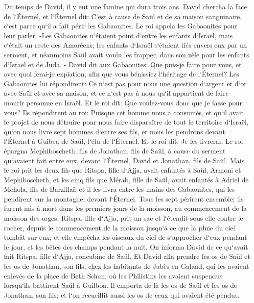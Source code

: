 \verse Du temps de David, il y eut une famine qui dura trois ans. David chercha la face de l`Éternel, et l`Éternel dit: C`est à cause de Saül et de sa maison sanguinaire, c`est parce qu`il a fait périr les Gabaonites. 
\verse Le roi appela les Gabaonites pour leur parler. -Les Gabaonites n`étaient point d`entre les enfants d`Israël, mais c`était un reste des Amoréens; les enfants d`Israël s`étaient liés envers eux par un serment, et néanmoins Saül avait voulu les frapper, dans son zèle pour les enfants d`Israël et de Juda. - 
\verse David dit aux Gabaonites: Que puis-je faire pour vous, et avec quoi ferai-je expiation, afin que vous bénissiez l`héritage de l`Éternel? 
\verse Les Gabaonites lui répondirent: Ce n`est pas pour nous une question d`argent et d`or avec Saül et avec sa maison, et ce n`est pas à nous qu`il appartient de faire mourir personne en Israël. Et le roi dit: Que voulez-vous donc que je fasse pour vous? 
\verse Ils répondirent au roi: Puisque cet homme nous a consumés, et qu`il avait le projet de nous détruire pour nous faire disparaître de tout le territoire d`Israël, 
\verse qu`on nous livre sept hommes d`entre ses fils, et nous les pendrons devant l`Éternel à Guibea de Saül, l`élu de l`Éternel. Et le roi dit: Je les livrerai. 
\verse Le roi épargna Mephiboscheth, fils de Jonathan, fils de Saül, à cause du serment qu`avaient fait entre eux, devant l`Éternel, David et Jonathan, fils de Saül. 
\verse Mais le roi prit les deux fils que Ritspa, fille d`Ajja, avait enfantés à Saül, Armoni et Mephiboscheth, et les cinq fils que Mérab, fille de Saül, avait enfantés à Adriel de Mehola, fils de Barzillaï; 
\verse et il les livra entre les mains des Gabaonites, qui les pendirent sur la montagne, devant l`Éternel. Tous les sept périrent ensemble; ils furent mis à mort dans les premiers jours de la moisson, au commencement de la moisson des orges. 
\verse Ritspa, fille d`Ajja, prit un sac et l`étendit sous elle contre le rocher, depuis le commencement de la moisson jusqu`à ce que la pluie du ciel tombât sur eux; et elle empêcha les oiseaux du ciel de s`approcher d`eux pendant le jour, et les bêtes des champs pendant la nuit. 
\verse On informa David de ce qu`avait fait Ritspa, fille d`Ajja, concubine de Saül. 
\verse Et David alla prendre les os de Saül et les os de Jonathan, son fils, chez les habitants de Jabès en Galaad, qui les avaient enlevés de la place de Beth Schan, où les Philistins les avaient suspendus lorsqu`ils battirent Saül à Guilboa. 
\verse Il emporta de là les os de Saül et les os de Jonathan, son fils; et l`on recueillit aussi les os de ceux qui avaient été pendus. 
